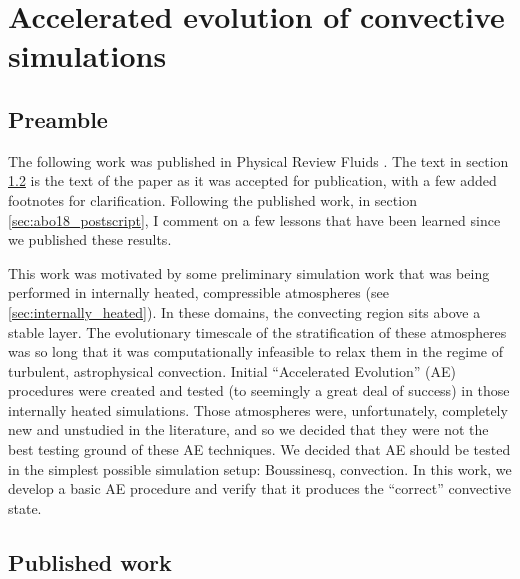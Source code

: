 \chapter{Accelerated evolution of convective simulations}
\label{ch:abo18}

\section{Preamble}
The following work was published in Physical Review Fluids \citep{anders&all2018}.
The text in section \ref{sec:abo18_published} is the text of the paper as it was accepted for publication, with a few added footnotes for clarification.
Following the published work, in section \ref{sec:abo18_postscript}, I comment on a few lessons that have been learned since we published these results.

This work was motivated by some preliminary simulation work that was being performed in internally heated, compressible atmospheres (see \ref{sec:internally_heated}).
In these domains, the convecting region sits above a stable layer.
The evolutionary timescale of the stratification of these atmospheres was so long that it was computationally infeasible to relax them in the regime of turbulent, astrophysical convection.
Initial ``Accelerated Evolution'' (AE) procedures were created and tested (to seemingly a great deal of success) in those internally heated simulations.
Those atmospheres were, unfortunately, completely new and unstudied in the literature, and so we decided that they were not the best testing ground of these AE techniques.
We decided that AE should be tested in the simplest possible simulation setup: Boussinesq, \RB convection.
In this work, we develop a basic AE procedure and verify that it produces the ``correct'' convective state.

\section{Published work}
\label{sec:abo18_published}

